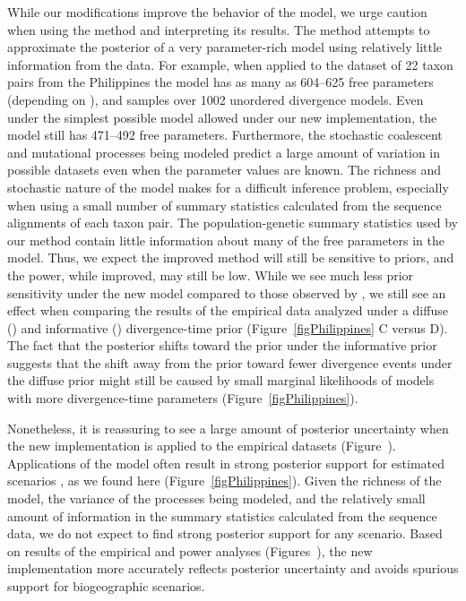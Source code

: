 While our modifications improve the behavior of the model, we urge caution when
using the method and interpreting its results.
The method attempts to approximate the posterior of a very parameter-rich model
using relatively little information from the data.
For example, when applied to the dataset of 22 taxon pairs from the Philippines
\citep{Oaks2012} the model has as many as 604--625 free parameters
(depending on \divTimeNum), and samples over 1002 unordered divergence models.
Even under the simplest possible model allowed under our new implementation,
the model still has 471--492 free parameters.
Furthermore, the stochastic coalescent and mutational processes being modeled
predict a large amount of variation in possible datasets even when the
parameter values are known.
The richness and stochastic nature of the model makes for a difficult inference
problem, especially when using a small number of summary statistics calculated
from the sequence alignments of each taxon pair.
The population-genetic summary statistics used by our method contain little
information about many of the free parameters in the model.
Thus, we expect the improved method will still be sensitive to priors, and the
power, while improved, may still be low.
While we see much less prior sensitivity under the new model compared to those
observed by \citet{Oaks2012}, we still see an effect when comparing the results
of the empirical data analyzed under a diffuse (\empModelDPP) and informative
(\empModelDPPInform) divergence-time prior (Figure~\ref{figPhilippines} C
versus D).
The fact that the posterior shifts toward the prior under the informative prior
suggests that the shift away from the prior toward fewer divergence events
under the diffuse prior might still be caused by small marginal likelihoods
of models with more divergence-time parameters (Figure~\ref{figPhilippines}).

Nonetheless, it is reassuring to see a large amount of posterior uncertainty
when the new implementation is applied to the empirical datasets
(Figure~).
Applications of the \msb model often result in strong posterior support for
estimated scenarios
\citep{Barber2010,Bell2012,Carnaval2009,Chan2011,Hickerson2006,Leache2007,Plouviez2009,Stone2012,Voje2009,Oaks2012},
as we found here (Figure~\ref{figPhilippines}).
Given the richness of the model, the variance of the processes being modeled,
and the relatively small amount of information in the summary statistics
calculated from the sequence data, we do not expect to find strong posterior
support for any scenario.
Based on results of the empirical and power analyses
(Figures~),
the new implementation more accurately reflects posterior uncertainty and
avoids spurious support for biogeographic scenarios.

